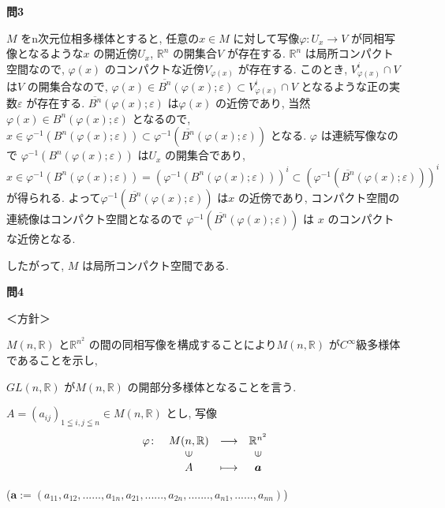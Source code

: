 \documentclass[dvipdfmx]{jsarticle}
\begin{document}
\bigskip

\textbf{問3}

$M$ をn次元位相多様体とすると, 任意の$x \in M$ に対して写像$\varphi: U_x \to V$ が同相写像となるような$x$ の開近傍$U_x$, $\mathbb{R}^n$ の開集合$V$ が存在する. $\mathbb{R}^n$ は局所コンパクト空間なので, $\varphi(x)$ のコンパクトな近傍$V_{\varphi(x)}$ が存在する. このとき, $V_{\varphi(x)}^i \cap V$ は$V$ の開集合なので, $\varphi(x) \in \overline{B^n}(\varphi(x) ; \varepsilon) \subset V_{\varphi(x)}^i \cap V$ となるような正の実数$\varepsilon$ が存在する. $\overline{B^n}(\varphi(x) ; \varepsilon)$ は$\varphi(x)$ の近傍であり, 当然$\varphi(x) \in B^n(\varphi(x) ; \varepsilon)$ となるので, 
$x \in \varphi^{-1} (B^n(\varphi(x) ; \varepsilon)) \subset \varphi^{-1} (\overline{B^n}(\varphi(x) ; \varepsilon))$
となる. $\varphi$ は連続写像なので $\varphi^{-1} (B^n(\varphi(x) ; \varepsilon))$ は$U_x$ の開集合であり,
$x \in \varphi^{-1} (B^n(\varphi(x) ; \varepsilon)) 
= (\varphi^{-1} (B^n(\varphi(x) ; \varepsilon)))^i
\subset (\varphi^{-1} (\overline{B^n}(\varphi(x) ; \varepsilon)))^i$ が得られる.
よって$\varphi^{-1} (\overline{B^n}(\varphi(x) ; \varepsilon))$ は$x$ の近傍であり, コンパクト空間の連続像はコンパクト空間となるので $\varphi^{-1} (\overline{B^n}(\varphi(x) ; \varepsilon))$ は $x$ のコンパクトな近傍となる.

したがって, $M$ は局所コンパクト空間である.

\bigskip

\textbf{問4}

＜方針＞

$M(n, \mathbb{R})$ と$\mathbb{R}^{n^2}$ の間の同相写像を構成することにより$M(n, \mathbb{R})$ が$C^{\infty}$級多様体であることを示し,

$GL(n, \mathbb{R})$ が$M(n, \mathbb{R})$ の開部分多様体となることを言う.

\bigskip

$A = (a_{ij})_{1\leqq i, j \leqq n} \in M(n, \mathbb{R})$ とし, 
写像
\[\begin{array}{rccc}
\varphi \colon & M(n, \mathbb{R}) & \longrightarrow & \mathbb{R}^{n^2} \\
        & \rotatebox{90}{$\in$} & & \rotatebox{90}{$\in$} \\
        & A & \longmapsto & \bm{a}
\end{array}\]

\begin{flushright}
($\bm{a} := (a_{11}, a_{12}, ......, a_{1n}, a_{21}, ......, a_{2n}, ......., a_{n1}, ......, a_{nn})$)  
\end{flushright}
\end{document}
